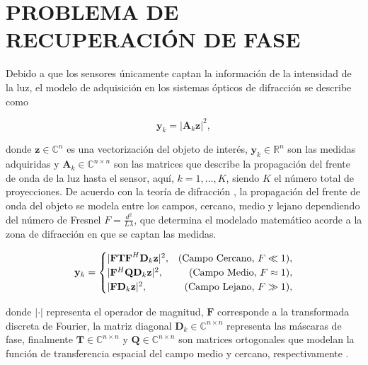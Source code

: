 \section{PROBLEMA DE RECUPERACIÓN DE FASE}

Debido a que los sensores únicamente captan la información de la intensidad de la luz, el modelo de adquisición en los sistemas ópticos de difracción se describe como

\begin{equation}
    \mathbf{y}_k = \vert \mathbf{A}_k\mathbf{z} \vert^2, 
    \label{eq:phase_retrieval_problem}
\end{equation}

donde $\mathbf{z} \in {\mathbb{C}}^{n}$ es una vectorización del objeto de interés, $\mathbf{y}_k \in \mathbb{R}^{n}$ son las medidas adquiridas y $\mathbf{A}_k\in\mathbb{C}^{n\times n}$ son las matrices que describe la propagación del frente de onda de la luz hasta el sensor, aquí,  $k=1,\dots,K$, siendo $K$ el número total de proyecciones. De acuerdo con la teoría de difracción , la propagación del frente de onda del objeto se modela entre los campos, cercano, medio y lejano dependiendo del número de Fresnel $F = \frac{d^2}{L\lambda}$, que determina el modelado matemático acorde a la zona de difracción en que se captan las medidas.

\begin{align}
    \mathbf{y}_k= 
         \begin{cases}
            \vert \mathbf{FTF}^{H}\mathbf{D}_k\mathbf{z} \vert^2, & \hfill (\text{Campo Cercano, }F \ll 1) \nonumber, \\ 
            \vert \mathbf{F}^{H}\mathbf{Q}\mathbf{D}_k\mathbf{z} \vert^2,  & \hfill (\text{Campo Medio, }F \approx 1), \\
            \vert \mathbf{F}\mathbf{D}_k\mathbf{z} \vert^2,  & \hfill (\text{Campo Lejano, } F \gg 1),   \nonumber
         \end{cases}
    \label{eq:modelado_zonas_difraccion}
\end{align}

donde $\vert \cdot \vert$ representa el operador de magnitud, $\mathbf{F}$ corresponde a la transformada discreta de Fourier, la matriz diagonal $\mathbf{D}_k \in \mathbb{C}^{n \times n}$ representa las máscaras de fase, finalmente $\mathbf{T} \in \mathbb{C}^{n \times n}$ y $\mathbf{Q} \in \mathbb{C}^{n \times n}$ son matrices ortogonales que modelan la función de transferencia espacial del campo medio y cercano, respectivamente .

